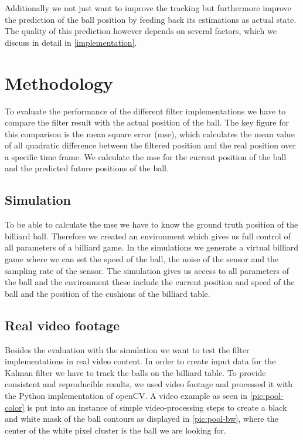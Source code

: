 \documentclass[notitlepage, a4paper, 11pt]{scrartcl}
\begin{document}
\begin{multicols}{2}
Additionally we not just want to improve the tracking but furthermore improve the prediction of the ball position by feeding back its estimations as actual state. 
The quality of this prediction however depends on several factors, which we discuss in detail in \cref{implementation}.

\section{Methodology}

To evaluate the performance of the different filter implementations we have to compare the filter result with the actual position of the ball.
The key figure for this comparison is the mean square error (mse), which calculates the mean value of all quadratic difference between the filtered position and the real position over a specific time frame.
We calculate the mse for the current position of the ball and the predicted future positions of the ball.
\subsection{Simulation}

To be able to calculate the mse we have to know the ground truth position of the billiard ball.
Therefore we created an environment which gives us full control of all parameters of a billiard game.
In the simulations we generate a virtual billiard game where we can set the speed of the ball, the noise of the sensor and the sampling rate of the sensor.
The simulation gives us access to all parameters of the ball and the environment these include the current position and speed of the ball and the position of the cushions of the billiard table.

\subsection{Real video footage}

Besides the evaluation with the simulation we want to test the filter implementations in real video content.
In order to create input data for the Kalman filter we have to track the balls on the billiard table. 
To provide consistent and reproducible results, we used video footage and processed it with the Python implementation of openCV.
A video example as seen in \cref{pic:pool-color} is put into an instance of simple video-processing steps to create a black and white mask of the ball contours as displayed in \cref{pic:pool-bw},
where the center of the white pixel cluster is the ball we are looking for.


\end{multicols}
\end{document}
